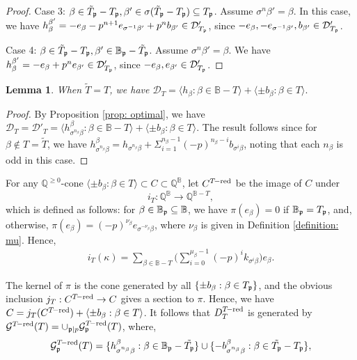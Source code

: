\documentclass[11pt,pdflatex]{amsart}
\theoremstyle{plain}
\newtheorem{lemma}[theorem]{Lemma}
\theoremstyle{definition}
\newcommand{\QQ}{\mathbf{Q}}
\theoremstyle{plain}
\theoremstyle{definition}
\theoremstyle{remark}
\numberwithin{equation}{section}
\numberwithin{figure}{section} \numberwithin{table}{subsection}
\newcommand{\gerp}{{\frak{p}}}
\newcommand{\calD}{{\mathcal{D}}}
\newcommand{\calG}{{\mathcal{G}}}
\def\BB{\mathbb{B}}
\def\QQ{\mathbb{Q}}
\begin{document}
\begin{proof}
\vspace{2mm}

\noindent Case 3: $\beta \in \tilde{T}_\gerp-T_\gerp, \beta' \in \sigma(\tilde{T}_\gerp-T_\gerp)\subseteq T_\gerp$. Assume $\sigma^n\beta'=\beta$. In this case, we  have $h_\beta^{\beta'}=-e_\beta-p^{n+1}e_{\sigma^{-1}\beta'}+p^nb_{\beta'} \in \calD'_{T_\gerp}$, since $-e_\beta, -e_{\sigma^{-1}\beta'}, b_{\beta'} \in \calD'_{T_\gerp}$.

\vspace{2mm}

\noindent Case 4: $\beta \in \tilde{T}_\gerp-T_\gerp, \beta' \in {\BB}_\gerp-\tilde{T}_\gerp$. Assume $\sigma^n\beta'=\beta$. We have $h_\beta^{\beta'}=-e_{\beta}+ p^ne_{\beta'} \in \calD'_{T_\gerp}$, since $-e_\beta, e_{\beta'} \in \calD'_{T_\gerp}$.
   \end{proof}

\begin{lemma} \label{lemma: no boxes} When $\tilde{T}=T$, we have $\calD_{T}=\langle h_\beta : \beta \in \BB-T \rangle + \langle \pm b_\beta: \beta \in T \rangle.$
\end{lemma}
\begin{proof} By Proposition \ref{prop: optimal}, we  have $\calD_T=\calD'_T=\langle h_{\sigma^{n_\beta}\beta}^\beta: \beta \in \BB-T \rangle  + \langle \pm b_\beta: \beta \in T \rangle$. The result follows since
for  $\beta \not \in T=\tilde{T}$, we have   $h_{\sigma^{n_\beta}\beta}^\beta=h_{\sigma^{n_\beta}\beta}+\Sigma_{i=1}^{n_\beta-1} {(-p)^{n_\beta-i}} b_{\sigma^i\beta}$, noting that each $n_\beta$ is odd in this case.
\end{proof}
    

For any $\QQ^{\geq 0}$-cone $\langle \pm b_\beta: \beta \in T \rangle \subset C \subset \QQ^{\BB}$, let $C^{T\!-{\rm red}}$ be the image of $C$ under
$$i_T: \QQ^{\BB} \rightarrow \QQ^{\BB-T},$$
which is defined as follows: for $\beta \in \BB_\gerp \subseteq \BB$, we have  $\pi(e_\beta)=0$ if $\BB_\gerp=T_\gerp$, and, otherwise,  $\pi(e_\beta)= (-p)^{\nu_\beta}e_{\sigma^{-\nu_\beta}\beta}$, where $\nu_\beta$ is given in Definition \ref{definition: mu}. Hence, 
\begin{eqnarray}\label{equation: L-beta} i_T (\kappa)=\sum_{\beta \in \BB-T} \big(\sum_{i=0}^{\mu_\beta-1} (-p)^i k_{\sigma^{i}\beta}\big )e_\beta.\end{eqnarray}

The kernel of $\pi$ is the cone generated by all $\{\pm b_\beta: \beta \in T_\gerp\}$, and  the obvious inclusion $j_T: C^{T\!-{\rm red}} \rightarrow C$ gives a section to $\pi$. Hence, we have $C=j_T(C^{T\!-{\rm red}})+ \langle \pm b_\beta: \beta \in T \rangle$. It follows that $D^{{T\!-{\rm red}}}_{T}$ is generated by $\calG^{T\!-{\rm red}}(T)=\cup_{\gerp|p} \calG_\gerp^{T\!-{\rm red}}(T)$, where,
 \begin{eqnarray*} \calG_\gerp^{T\!-{\rm red}}(T)=\{h_{\sigma^{n_\beta}{\beta}}^\beta: \beta \in \BB_\gerp-\tilde{T_\gerp} \} \cup \{-b_{\sigma^{n_\beta}\beta}^{\beta}: \beta \in \tilde{T_\gerp}-T_\gerp\}, \end{eqnarray*}
\end{document}
